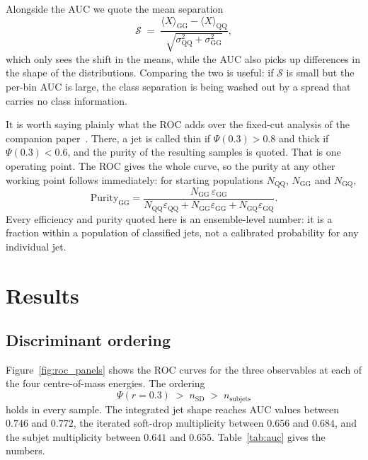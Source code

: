 \documentclass[reprint,amsmath,amssymb,aps,prd,floatfix]{revtex4-2}
\begin{document}
Alongside the AUC we quote the mean separation
\begin{equation}
\mathcal{S} \;=\;
\frac{\langle X\rangle_{\mathrm{GG}} - \langle X\rangle_{\mathrm{QQ}}}
     {\sqrt{\sigma^2_{\mathrm{QQ}} + \sigma^2_{\mathrm{GG}}}},
\label{eq:sep}
\end{equation}
which only sees the shift in the means, while the AUC also picks up differences
in the shape of the distributions. Comparing the two is useful: if
$\mathcal{S}$ is small but the per-bin AUC is large, the class separation is
being washed out by a spread that carries no class information.

It is worth saying plainly what the ROC adds over the fixed-cut analysis of the
companion paper~\cite{Singh:2026photo}. There, a jet is called thin if
$\Psi(0.3) > 0.8$ and thick if
$\Psi(0.3) < 0.6$, and the purity of the resulting samples is quoted. That is
one operating point. The ROC gives the whole curve, so the purity at any other
working point follows immediately: for starting populations $N_{\mathrm{QQ}}$,
$N_{\mathrm{GG}}$ and $N_{\mathrm{GQ}}$,
\begin{equation}
\mathrm{Purity}_{\mathrm{GG}} =
\frac{N_{\mathrm{GG}}\,\varepsilon_{\mathrm{GG}}}
     {N_{\mathrm{QQ}}\varepsilon_{\mathrm{QQ}}
    + N_{\mathrm{GG}}\varepsilon_{\mathrm{GG}}
    + N_{\mathrm{GQ}}\varepsilon_{\mathrm{GQ}}}.
\end{equation}
Every efficiency and purity quoted here is an ensemble-level number: it is a
fraction within a population of classified jets, not a calibrated probability
for any individual jet.

\section{Results}\label{sec:results}

\subsection{Discriminant ordering}

Figure~\ref{fig:roc_panels} shows the ROC curves for the three observables at each
of the four centre-of-mass energies. The ordering
\begin{equation}
\Psi(r=0.3) \;>\; n_{\mathrm{SD}} \;>\; n_{\mathrm{subjets}}
\end{equation}
holds in every sample. The integrated jet shape reaches AUC values between
$0.746$ and $0.772$, the iterated soft-drop multiplicity between $0.656$ and
$0.684$, and the subjet multiplicity between $0.641$ and $0.655$.
Table~\ref{tab:auc} gives the numbers.
\end{document}

